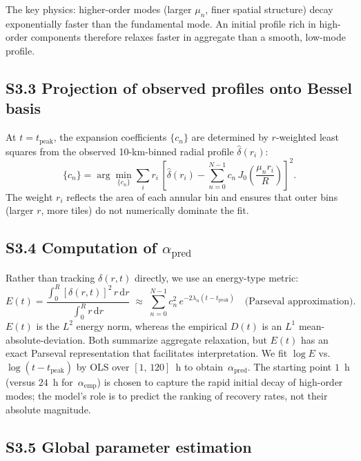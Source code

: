 \documentclass[11pt]{article}
\newcommand{\apred}{\alpha_{\mathrm{pred}}}
\newcommand{\aemp}{\alpha_{\mathrm{emp}}}
\begin{document}
The key physics: higher-order modes (larger $\mu_n$, finer spatial
structure) decay exponentially faster than the fundamental mode.
An initial profile rich in high-order components therefore relaxes
faster in aggregate than a smooth, low-mode profile.

\subsection*{S3.3 Projection of observed profiles onto Bessel basis}

At $t = t_{\mathrm{peak}}$, the expansion coefficients $\{c_n\}$
are determined by $r$-weighted least squares from the observed
10-km-binned radial profile $\hat\delta(r_i)$:
\begin{equation}
  \{c_n\} = \arg\min_{\{c_n\}} \sum_i r_i\,
  \left[\hat\delta(r_i)
        - \sum_{n=0}^{N-1} c_n\,J_0\!\left(\frac{\mu_n r_i}{R}\right)
  \right]^2 .
  \label{si:eq:lsq}
\end{equation}
The weight $r_i$ reflects the area of each annular bin and ensures
that outer bins (larger $r$, more tiles) do not numerically dominate
the fit.

\subsection*{S3.4 Computation of $\apred$}

Rather than tracking $\delta(r,t)$ directly, we use an energy-type
metric:
\begin{equation}
  E(t) = \frac{\int_0^R [\delta(r,t)]^2\,r\,\mathrm{d}r}
               {\int_0^R r\,\mathrm{d}r}
       \;\approx\; \sum_{n=0}^{N-1} c_n^2\,e^{-2\lambda_n
               (t-t_{\mathrm{peak}})}
  \quad\text{(Parseval approximation)}.
  \label{si:eq:energy}
\end{equation}
$E(t)$ is the $L^2$ energy norm, whereas the empirical $D(t)$ is an
$L^1$ mean-absolute-deviation.  Both summarize aggregate relaxation,
but $E(t)$ has an exact Parseval representation that facilitates
interpretation.  We fit $\log E$ vs.\ $\log(t - t_{\mathrm{peak}})$
by OLS over $[1,\,120]$~h to obtain~$\apred$.  The starting point
$1$~h (versus $24$~h for~$\aemp$) is chosen to capture the rapid
initial decay of high-order modes; the model's role is to predict the
ranking of recovery rates, not their absolute magnitude.

\subsection*{S3.5 Global parameter estimation}
\end{document}
